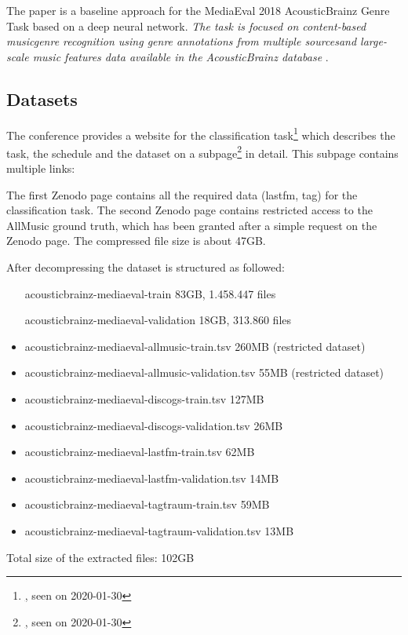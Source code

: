 \documentclass[sigconf,nonacm]{acmart}
\begin{document}
The paper is a baseline approach for the MediaEval 2018 AcousticBrainz Genre Task based on a deep neural network.
\textit{The task is focused on content-based musicgenre recognition using genre annotations from multiple sourcesand large-scale music features data available in the AcousticBrainz database} \cite{MediaEval1}.

\subsection{Datasets}

The conference provides a website for the classification task\footnote{\href{https://multimediaeval.github.io/2018-AcousticBrainz-Genre-Task/}, seen on 2020-01-30} which describes the task, the schedule and the dataset on a subpage\footnote{\href{https://multimediaeval.github.io/2018-AcousticBrainz-Genre-Task/data/}, seen on 2020-01-30} in detail.
This subpage contains multiple links:


The first Zenodo page contains all the required data (lastfm, tag) for the classification task. The second Zenodo page contains restricted access to the AllMusic ground truth, which has been granted after a simple request on the Zenodo page.
The compressed file size is about 47GB.

After decompressing the dataset is structured as followed:
\begin{itemize}
    \item [acousticbrainz-mediaeval-train] 83GB, 1.458.447 files
    \item [acousticbrainz-mediaeval-validation] 18GB, 313.860 files
    \item acousticbrainz-mediaeval-allmusic-train.tsv 260MB (restricted dataset)
    \item acousticbrainz-mediaeval-allmusic-validation.tsv 55MB (restricted dataset)
    \item acousticbrainz-mediaeval-discogs-train.tsv 127MB
    \item acousticbrainz-mediaeval-discogs-validation.tsv 26MB
    \item acousticbrainz-mediaeval-lastfm-train.tsv 62MB
    \item acousticbrainz-mediaeval-lastfm-validation.tsv 14MB
    \item acousticbrainz-mediaeval-tagtraum-train.tsv 59MB
    \item acousticbrainz-mediaeval-tagtraum-validation.tsv 13MB
\end{itemize}
Total size of the extracted files: 102GB
\end{document}
